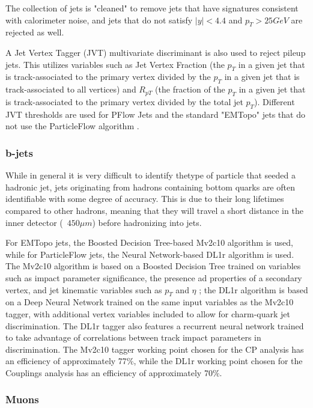 The collection of jets is "cleaned" to remove jets that have signatures consistent with calorimeter noise, and jets that do not satisfy $|y| < 4.4$ and $p_{T} > 25 GeV$ are rejected as well. 

A Jet Vertex Tagger (JVT) multivariate discriminant is also used to reject pileup jets. This utilizes variables such as Jet Vertex Fraction (the $p_{T}$ in a given jet that is track-associated to the primary vertex divided by the $p_{T}$ in a given jet that is track-associated to all vertices) and $R_{pT}$ (the fraction of the $p_{T}$ in a given jet that is track-associated to the primary vertex divided by the total jet $p_{T}$). Different JVT thresholds are used for PFlow Jets and the standard "EMTopo" jets that do not use the ParticleFlow algorithm \cite{JVT}.

\subsubsection{b-jets} \label{sec:b-jets} 

While in general it is very difficult to identify thetype of particle that seeded a hadronic jet, jets originating from hadrons containing bottom quarks are often identifiable with some degree of accuracy. This is due to their long lifetimes compared to other hadrons, meaning that they will travel a short distance in the inner detector (~$450 \mu m$) before hadronizing into jets. 

For EMTopo jets, the Boosted Decision Tree-based Mv2c10 algorithm is used, while for ParticleFlow jets, the Neural Network-based DL1r algorithm is used. The Mv2c10 algorithm is based on a Boosted Decision Tree trained on variables such as impact parameter significance, the presence ad properties of a secondary vertex, and jet kinematic variables such as $p_{T}$ and $\eta$ \cite{CERN-EP-2018-047} \cite{CERN-PH-EP-2015-216}; the DL1r algorithm is based on a Deep Neural Network \cite{ATL-PHYS-PUB-2017-013} trained on the same input variables as the Mv2c10 tagger, with additional vertex variables included to allow for charm-quark jet discrimination. The DL1r tagger also features a recurrent neural network trained to take advantage of correlations between track impact parameters in discrimination. The Mv2c10 tagger working point chosen for the CP analysis has an efficiency of approximately 77$\%$, while the DL1r working point chosen for the Couplings analysis has an efficiency of approximately 70$\%$.  

\subsubsection{Muons} \label{sec:Muons} 


